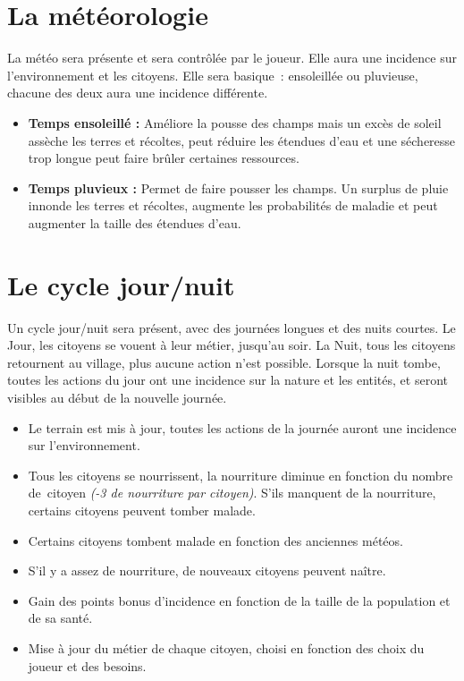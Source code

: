 \documentclass[a4paper]{article}
\begin{document}
    \section{La météorologie}
      La météo sera présente et sera contrôlée par le joueur. Elle aura une incidence sur l'environnement et les citoyens. Elle sera basique : ensoleillée ou pluvieuse, chacune des deux aura une incidence différente. 
      \begin{itemize}
        \item \textbf{Temps ensoleillé :} \small{ Améliore la pousse des champs mais un excès de soleil assèche les terres et récoltes, peut réduire les étendues d'eau et une sécheresse trop longue peut faire brûler certaines ressources.}
        \item \textbf{Temps pluvieux :} \small{ Permet de faire pousser les champs. Un surplus de pluie innonde les terres et récoltes, augmente les probabilités de maladie et peut augmenter la taille des étendues d'eau.}
      \end{itemize}


    \section{Le cycle jour/nuit}
      Un cycle jour/nuit sera présent, avec des journées longues et des nuits courtes. Le Jour, les citoyens se vouent à leur métier, jusqu'au soir. La Nuit, tous les citoyens retournent au village, plus aucune action n'est possible. Lorsque la nuit tombe, toutes les actions du jour ont une incidence sur la nature et les entités, et seront visibles au début de la nouvelle journée.
      \begin{itemize} \small
        \item Le terrain est mis à jour, toutes les actions de la journée auront une incidence sur l'environnement.
        \item Tous les citoyens se nourrissent, la nourriture diminue en fonction du nombre de citoyen \textit{(-3 de nourriture par citoyen)}. S'ils manquent de la nourriture, certains citoyens peuvent tomber malade.
        \item Certains citoyens tombent malade en fonction des anciennes météos.
        \item S'il y a assez de nourriture, de nouveaux citoyens peuvent naître.
        \item Gain des points bonus d'incidence en fonction de la taille de la population et de sa santé.
        \item Mise à jour du métier de chaque citoyen, choisi en fonction des choix du joueur et des besoins.
      \end{itemize} \normalsize
\end{document}
